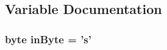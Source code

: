 \subsection{Variable Documentation}
\hypertarget{OWSearch_8ino_a62cd173143ff9c15a38fd17ab56970c9}{
\subsubsection[{in\-Byte}]{\setlength{\rightskip}{0pt plus 5cm}byte in\-Byte = 's'}}\label{OWSearch_8ino_a62cd173143ff9c15a38fd17ab56970c9}
